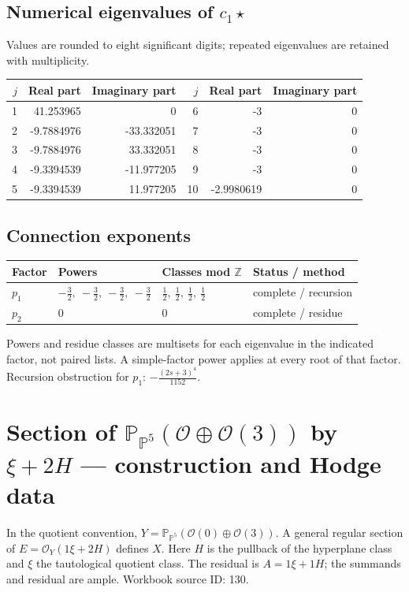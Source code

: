 \documentclass[10pt,a4paper]{article}
\begin{document}
\subsection*{Numerical eigenvalues of $c_1\star$}
Values are rounded to eight significant digits; repeated eigenvalues are retained with multiplicity.
\begin{center}\small\begin{tabular}{rrr@{\qquad}rrr}\toprule $j$ & Real part & Imaginary part & $j$ & Real part & Imaginary part\\\midrule
1 & 41.253965 & 0 & 6 & -3 & 0\\
2 & -9.7884976 & -33.332051 & 7 & -3 & 0\\
3 & -9.7884976 & 33.332051 & 8 & -3 & 0\\
4 & -9.3394539 & -11.977205 & 9 & -3 & 0\\
5 & -9.3394539 & 11.977205 & 10 & -2.9980619 & 0\\
\bottomrule\end{tabular}\end{center}
\subsection*{Connection exponents}
\begin{center}\begin{tabular}{llll}\toprule Factor & Powers & Classes mod $\mathbb Z$ & Status / method\\\midrule
$p_{1}$ & $- \frac{3}{2},\ - \frac{3}{2},\ - \frac{3}{2},\ - \frac{3}{2}$ & $\frac{1}{2},\ \frac{1}{2},\ \frac{1}{2},\ \frac{1}{2}$ & complete / recursion\\
$p_{2}$ & $0$ & $0$ & complete / residue\\
\bottomrule\end{tabular}\end{center}
Powers and residue classes are multisets for each eigenvalue in the indicated factor, not paired lists. A simple-factor power applies at every root of that factor.
Recursion obstruction for $p_{1}$: $- \frac{\left(2 s + 3\right)^{4}}{1152}$.
\clearpage\section*{Section of $\mathbb P_{\mathbb P^{5}}(\mathcal O\oplus \mathcal O(3))$ by $\xi +2H$ --- construction and Hodge data}\label{entry:PB5-130}
In the quotient convention, $Y=\mathbb P_{\mathbb P^{5}}(\mathcal O(0)\oplus\mathcal O(3))$.
A general regular section of $E=\mathcal O_Y(1\xi+2H)$ defines $X$.
Here $H$ is the pullback of the hyperplane class and $\xi$ the tautological quotient class. The residual is $A=1\xi+1H$; the summands and residual are ample.
Workbook source ID: 130.
\end{document}
